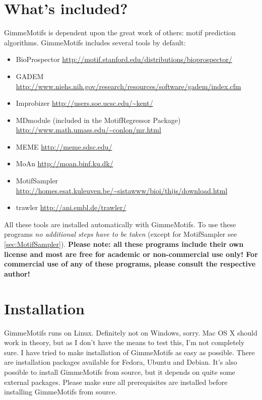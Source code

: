 \documentclass[11pt]{article}
\begin{document}
\section{What's included?}
GimmeMotifs is dependent upon the great work of others: motif prediction algorithms. GimmeMotifs includes several tools by default:
\begin{itemize}
\item BioProspector \cite{liu_bioprospector:_2001} \url{http://motif.stanford.edu/distributions/bioprospector/}
\item GADEM \cite{li_gadem:genetic_2009} \url{http://www.niehs.nih.gov/research/resources/software/gadem/index.cfm}
\item Improbizer \cite{ao_environmentally_2004} \url{http://users.soe.ucsc.edu/~kent/}
\item MDmodule \cite{liu_algorithm_2002} (included in the MotifRegressor Package) \url{http://www.math.umass.edu/~conlon/mr.html}
\item MEME \cite{bailey_meme_2009} \url{http://meme.sdsc.edu/}
\item MoAn \cite{valen_discovery_2009} \url{http://moan.binf.ku.dk/}
\item MotifSampler \cite{thijs_higher-order_2001,thijs_gibbs_2002} \url{http://homes.esat.kuleuven.be/~sistawww/bioi/thijs/download.html}
\item trawler \cite{ettwiller_trawler:_2007} \url{http://ani.embl.de/trawler/}
\end{itemize}
All these tools are installed automatically with GimmeMotifs. To use these programs \emph{no additional steps have to be taken} (except for MotifSampler see \ref{sec:MotifSampler}). \textbf{Please note: all these programs include their own license and most are free for academic or non-commercial use only! For commercial use of any of these programs, please consult the respective author!}

\section{Installation}
GimmeMotifs runs on Linux. Definitely not on Windows, sorry. Mac OS X should work in theory, but as I don't have the means to test this, I'm not completely sure. I have tried to make installation of GimmeMotifs as easy as possible. There are installation packages available for Fedora, Ubuntu and Debian. It's also possible to install GimmeMotifs from source, but it depends on quite some external packages. Please make sure all prerequisites are installed before installing GimmeMotifs from source. 
\end{document}

